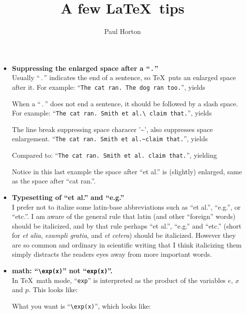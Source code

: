 \documentclass{article}
\title{A few \LaTeX\ tips}
\author{Paul Horton}
\newcommand*\itembf[1]{\item \textbf{#1}\\}
\begin{document}
\maketitle


\begin{itemize}
\itembf{Suppressing the enlarged space after a ``\,.\,''}
Usually ``\,.\,'' indicates the end of a sentence, so \TeX\ puts an enlarged space after it.
For example: ``\texttt{The cat ran.  The dog ran too.}'', yields
\begin{center}\end{center}
When a ``\,.\,'' does not end a sentence, it should be followed by a slash space.
%
For example: ``\texttt{The cat ran.  Smith et al.\textbackslash\ claim that.}'', yields
\begin{center}\end{center}
%
The line break suppressing space characer '\textasciitilde', also suppresses space enlargement.
``\texttt{The cat ran.  Smith et al.\textasciitilde claim that.}'', yields
\begin{center}\end{center}
%
Compared to: ``\texttt{The cat ran.  Smith et al. claim that.}'', yielding
\begin{center}\end{center}
Notice in this last example the space after ``et al.'' is (slightly) enlarged, same as the space after ``cat ran.''.


\itembf{Typesetting of ``et al.'' and ``e.g.''}
I prefer not to italize some latin-base abbreviations such as ``et al.'', ``e.g.'', or ``etc.''.
I am aware of the general rule that latin (and other ``foreign'' words) should be italicized,
and by that rule perhaps ``et al.'', ``e.g.'' and ``etc.''
(short for \textit{et alia}, \textit{exampli gratia}, and \textit{et cetera}) should be italicized.
However they are so common and ordinary in scientific writing that I think italicizing them
simply distracts the readers eyes away from more important words.


\itembf{math: ``\texttt{\textbackslash exp(x)}'' not ``\texttt{exp(x)}''.}
In \TeX\ math mode, ``\texttt{exp}'' is interpreted as the product of the variables $e$, $x$ and $p$.
This looks like:
\begin{center}\end{center}
What you want is ``\texttt{\textbackslash exp(x)}'', which looks like:
\begin{center}\end{center}


\end{itemize}
\end{document}
